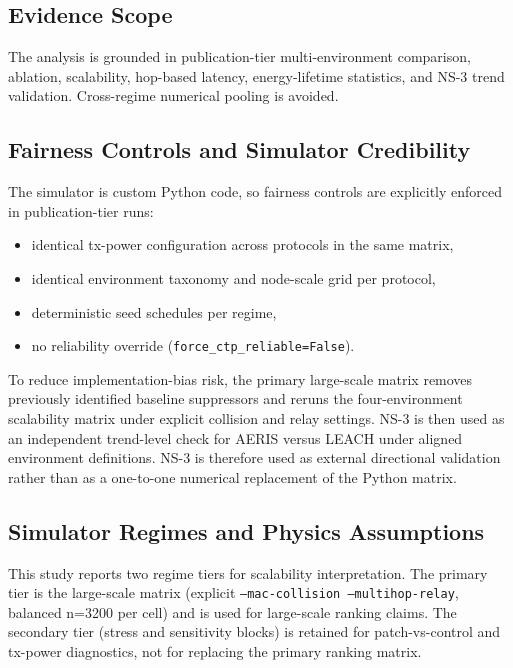 ﻿\documentclass[sensors,article,submit,moreauthors,pdftex]{Definitions/mdpi}
\begin{document}
\subsection{Evidence Scope}
The analysis is grounded in publication-tier multi-environment comparison, ablation, scalability, hop-based latency, energy-lifetime statistics, and NS-3 trend validation. Cross-regime numerical pooling is avoided.

\subsection{Fairness Controls and Simulator Credibility}
The simulator is custom Python code, so fairness controls are explicitly enforced in publication-tier runs:
\begin{itemize}
\item identical tx-power configuration across protocols in the same matrix,
\item identical environment taxonomy and node-scale grid per protocol,
\item deterministic seed schedules per regime,
\item no reliability override (\texttt{force\_ctp\_reliable=False}).
\end{itemize}

To reduce implementation-bias risk, the primary large-scale matrix removes previously identified baseline suppressors and reruns the four-environment scalability matrix under explicit collision and relay settings. NS-3 is then used as an independent trend-level check for AERIS versus LEACH under aligned environment definitions. NS-3 is therefore used as external directional validation rather than as a one-to-one numerical replacement of the Python matrix.

\subsection{Simulator Regimes and Physics Assumptions}
This study reports two regime tiers for scalability interpretation. The primary tier is the large-scale matrix (explicit \texttt{--mac-collision --multihop-relay}, balanced n=3200 per cell) and is used for large-scale ranking claims. The secondary tier (stress and sensitivity blocks) is retained for patch-vs-control and tx-power diagnostics, not for replacing the primary ranking matrix.
\end{document}
